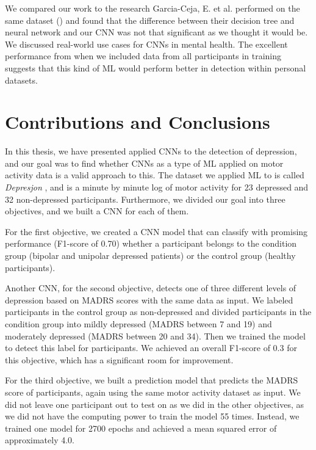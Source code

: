 We compared our work to the research Garcia-Ceja, E. et al. performed on the same dataset (\cite{GarciaCeja2018_classification_bipolar}) and found that the difference between their decision tree and neural network and our CNN was not that significant as we thought it would be. We discussed real-world use cases for CNNs in mental health. The excellent performance from when we included data from all participants in training suggests that this kind of ML would perform better in detection within personal datasets.

\section{Contributions and Conclusions}

In this thesis, we have presented applied CNNs to the detection of depression, and our goal was to find whether CNNs as a type of ML applied on motor activity data is a valid approach to this. The dataset we applied ML to is called \textit{Depresjon} \cite{dataset}, and is a minute by minute log of motor activity for 23 depressed and 32 non-depressed participants. Furthermore, we divided our goal into three objectives, and we built a CNN for each of them.  

For the first objective, we created a CNN model that can classify with promising performance (F1-score of 0.70) whether a participant belongs to the condition group (bipolar and unipolar depressed patients) or the control group (healthy participants). 

Another CNN, for the second objective, detects one of three different levels of depression based on MADRS scores with the same data as input. We labeled participants in the control group as non-depressed and divided participants in the condition group into mildly depressed (MADRS between 7 and 19) and moderately depressed (MADRS between 20 and 34). Then we trained the model to detect this label for participants. We achieved an overall F1-score of 0.3 for this objective, which has a significant room for improvement. 

For the third objective, we built a prediction model that predicts the MADRS score of participants, again using the same motor activity dataset as input. We did not leave one participant out to test on as we did in the other objectives, as we did not have the computing power to train the model 55 times. Instead, we trained one model for 2700 epochs and achieved a mean squared error of approximately 4.0. 

